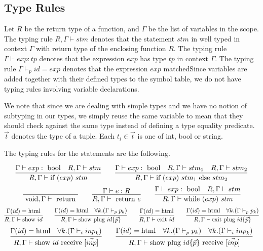 \documentclass{WigReport}
\begin{document}
\subsection{Type Rules}
Let $R$ be the return type of a function, and $\Gamma$ be the list of variables in the scope. The typing rule $R, \Gamma \vdash stm$ denotes that the statement $stm$ in well typed in context $\Gamma$ with return type of the enclosing function $R$. The typing rule $\Gamma \vdash exp : tp$ denotes that the expression $exp$ has type $tp$ in context $\Gamma$. The typing rule $\Gamma \vdash_p id = exp$ denotes that the expression $exp$ matchedSince variables are added together with their defined types to the symbol table, we do not have typing rules involving variable declarations. 

We note that since we are dealing with simple types and we have no notion of subtyping in our types, we simply reuse the same variable to mean that they should check against the same type instead of defining a type equality predicate. $\vec t$ denotes the type of a tuple. Each $t_i \in \vec t$ is one of int, bool or string.

\newcommand{\return}{\text{ return }}
\newcommand{\void}{\text{ void}}
\newcommand{\ifthen}[1]{\text{if }(#1)\ }
\newcommand{\ifelse}[2]{\text{if }(#1)\ #2 \text{ else }}
\newcommand{\bool}{\text{ bool}}
\newcommand{\inttp}{\text{ int}}
\newcommand{\stringtp}{\text{ string}}
\newcommand{\tupletp}{\text{ tuple }}
\newcommand{\while}[1]{\text{while }(#1)\ }
\newcommand{\showd}{\text{show }}
\newcommand{\showplug}{\text{show plug }}
\newcommand{\receive}{\text{ receive }}
\newcommand{\exitd}{\text{exit }}
\newcommand{\exitplug}{\text{exit plug }}


The typing rules for the statements are the following.

$$\infer{R, \Gamma \vdash \ifthen {exp} stm}{\Gamma \vdash exp : \bool & R, \Gamma \vdash stm}\qquad
\infer{R, \Gamma \vdash \ifelse {exp} {stm_1} stm_2}{\Gamma \vdash exp : \bool & R, \Gamma \vdash stm_1 & R, \Gamma \vdash stm_2}$$
$$\infer{\void, \Gamma \vdash \return}{} \qquad
\infer{R, \Gamma \vdash \return e}{\Gamma \vdash e : R} \qquad
\infer{R, \Gamma \vdash \while {exp} stm}{\Gamma \vdash exp : \bool & R, \Gamma \vdash stm}$$
$$\infer{R, \Gamma \vdash \showd id}{\Gamma(id) = \text{html}} \qquad
\infer{R, \Gamma \vdash \showplug id \{\vec p\}}
      {\Gamma(id) = \text{html} & \forall k. (\Gamma \vdash_p p_k)}\qquad
\infer{R, \Gamma \vdash \exitd id}{\Gamma(id) = \text{html}}\qquad
\infer{R, \Gamma \vdash \exitplug id \{\vec p\}}
      {\Gamma(id) = \text{html} & \forall k.(\Gamma \vdash_p p_k)}$$
$$\infer{R, \Gamma \vdash \showd id \receive [\vec {inp}]}
      {\Gamma(id) = \text{html} & \forall k.(\Gamma \vdash_i {inp}_k)}\qquad
\infer{R, \Gamma \vdash \showplug id \{\vec p\} \receive [\vec {inp}]}
      {\Gamma(id) = \text{html} & \forall k. (\Gamma \vdash_p p_k) & \forall k.(\Gamma \vdash_i {inp}_k)}$$
\end{document}
